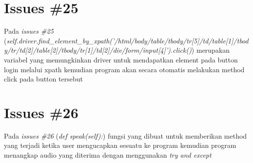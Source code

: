 \section{Issues \#25}
Pada \textit{issues \#25} (\textit{self.driver.find\_element\_by\_xpath('/html/body/table/tbody/tr[5]/td/table[1]/tbody/tr/td[2]/table[2]/tbody/tr[1]/td[2]/div/form/input[4]').click()}) merupakan variabel yang memungkinkan driver untuk mendapatkan element pada button login melalui xpath kemudian program akan secara otomatis melakukan method click pada button tersebut
\section{Issues \#26}
Pada \textit{issues \#26} (\textit{def speak(self):}) fungsi yang dibuat untuk memberikan method yang terjadi ketika user mengucapkan sesuatu ke program kemudian program menangkap audio yang diterima dengan menggunakan \textit{try and except}
